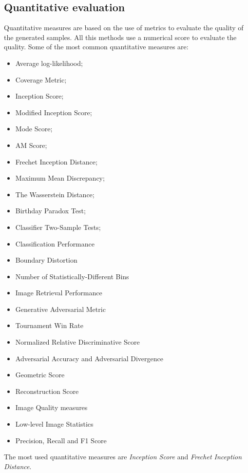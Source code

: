 \subsection{Quantitative evaluation}
\label{subsec:quantitative-evaluation}
Quantitative measures are based on the use of metrics to evaluate the quality of the generated samples.
All this methods use a numerical score to evaluate the quality.
Some of the most common quantitative measures are:
\begin{itemize}
    \item Average log-likelihood;
    \item Coverage Metric;
    \item Inception Score;
    \item Modified Inception Score;
    \item Mode Score;
    \item AM Score;
    \item Frechet Inception Distance;
    \item Maximum Mean Discrepancy;
    \item The Wasserstein Distance;
    \item Birthday Paradox Test;
    \item Classifier Two-Sample Tests;
    \item Classification Performance
    \item Boundary Distortion 
    \item Number of Statistically-Different Bins
    \item Image Retrieval Performance
    \item Generative Adversarial Metric
    \item Tournament Win Rate
    \item Normalized Relative Discriminative Score
    \item Adversarial Accuracy and Adversarial Divergence
    \item Geometric Score
    \item Reconstruction Score
    \item Image Quality measures
    \item Low-level Image Statistics
    \item Precision, Recall and F1 Score
\end{itemize}

The most used quantitative measures are \emph{Inception Score} and \emph{Frechet Inception Distance}.
